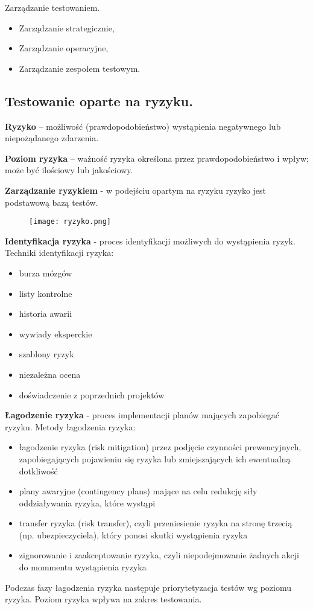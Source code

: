 \documentclass[../main.tex]{subfiles}
\begin{document}
    Zarządzanie testowaniem.
    \begin{itemize}
        \item Zarządzanie strategicznie,
        \item Zarządzanie operacyjne,
        \item Zarządzanie zespołem testowym.
    \end{itemize}

    \subsection{Testowanie oparte na ryzyku.}

    \textbf{Ryzyko} – możliwość (prawdopodobieństwo) wystąpienia negatywnego lub niepożądanego zdarzenia.

    \textbf{Poziom ryzyka} – ważność ryzyka określona przez prawdopodobieństwo i wpływ; może być ilościowy lub
    jakościowy.

    \textbf{Zarządzanie ryzykiem} - w podejściu opartym na ryzyku ryzyko jest podstawową bazą testów.

    \begin{figure}[H]
        \texttt{[image: ryzyko.png]}
    \end{figure}

    \textbf{Identyfikacja ryzyka} - proces identyfikacji możliwych do wystąpienia ryzyk. Techniki identyfikacji
    ryzyka:
    \begin{itemize}
        \item burza mózgów
        \item listy kontrolne
        \item historia awarii
        \item wywiady eksperckie
        \item szablony ryzyk
        \item niezależna ocena
        \item doświadczenie z poprzednich projektów
    \end{itemize}


    \textbf{Łagodzenie ryzyka} - proces implementacji planów mających zapobiegać ryzyku. Metody łagodzenia ryzyka:
    \begin{itemize}
        \item łagodzenie ryzyka (risk mitigation) przez podjęcie czynności prewencyjnych, zapobiegających pojawieniu się ryzyka lub zmiejszających ich ewentualną dotkliwość
        \item plany awaryjne (contingency plans) mające na celu redukcję siły oddziaływania ryzyka, które wystąpi
        \item transfer ryzyka (risk transfer), czyli przeniesienie ryzyka na stronę trzecią (np. ubezpieczyciela), który ponosi skutki wystąpienia ryzyka
        \item zignorowanie i zaakceptowanie ryzyka, czyli niepodejmowanie żadnych akcji do mommentu wystąpienia ryzyka
    \end{itemize}
    Podczas fazy łagodzenia ryzyka następuje priorytetyzacja testów wg poziomu ryzyka. Poziom ryzyka wpływa na zakres testowania.
\end{document}
